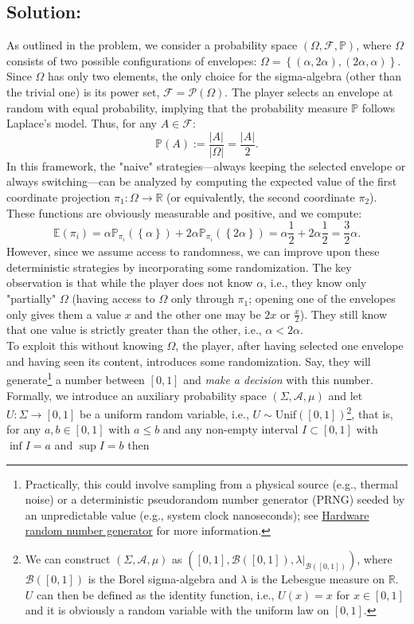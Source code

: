 \documentclass[11pt, a4paper, oneside]{article}
\newcommand{\solution}[1][]{\subsection*{#1}\hfill \par}
\theoremstyle{remark}
\theoremstyle{lemma}
\begin{document}
\solution[Solution:]
As outlined in the problem, we consider a probability space $\left(\Omega,\mathcal{F},\mathbb{P}\right)$, where $\Omega$ consists of two possible configurations of envelopes: $\Omega = \left\{\left(\alpha, 2\alpha\right), \left(2\alpha, \alpha\right)\right\}$. Since $\Omega$ has only two elements, the only choice for the sigma-algebra (other than the trivial one) is its power set, $\mathcal{F} = \mathscr{P}\left(\Omega\right)$. The player selects an envelope at random with equal probability, implying that the probability measure $\mathbb{P}$ follows Laplace's model. Thus, for any $A \in \mathcal{F}$:
    \[
    \mathbb{P}\left(A\right) := \frac{\left|A\right|}{\left|\Omega\right|} = \frac{\left|A\right|}{2}.
    \]
In this framework, the "naive" strategies—always keeping the selected envelope or always switching—can be analyzed by computing the expected value of the first coordinate projection $\pi_1:\Omega\rightarrow\mathbb{R}$ (or equivalently, the second coordinate $\pi_2$). These functions are obviously measurable and positive, and we compute:
$$\mathbb{E}\left(\pi_i\right)=\alpha\mathbb{P}_{\pi_i}\left(\left\{\alpha\right\}\right)+2\alpha\mathbb{P}_{\pi_i}\left(\left\{2\alpha\right\}\right)=\alpha\frac{1}{2}+2\alpha\frac{1}{2}=\frac{3}{2}\alpha.$$ 
However, since we assume access to randomness, we can improve upon these deterministic strategies by incorporating some randomization. The key observation is that while the player does not know $\alpha$, i.e., they know only "partially" $\Omega$ (having access to $\Omega$ only through $\pi_1$; opening one of the envelopes only gives them a value $x$ and the other one may be $2x$ or $\frac{x}{2}$). They still know that one value is strictly greater than the other, i.e., $\alpha < 2\alpha$. \\
To exploit this without knowing $\Omega$, the player, after having selected one envelope and having seen its content, introduces some randomization. Say, they will generate\footnote{Practically, this could involve sampling from a physical source (e.g., thermal noise) or a deterministic pseudorandom number generator (PRNG) seeded by an unpredictable value (e.g., system clock nanoseconds); see \href{https://en.wikipedia.org/wiki/Hardware_random_number_generator}{Hardware random number generator} for more information.} a number between $\left[0,1\right]$ and \textit{make a decision} with this number. Formally, we introduce an auxiliary probability space $\left(\Sigma,\mathcal{A},\mu\right)$ and let $U:\Sigma\rightarrow\left[0,1\right]$ be a uniform random variable, i.e., $U \sim \text{Unif}\left(\left[0,1\right]\right)$\footnote{We can construct $\left(\Sigma,\mathcal{A},\mu\right)$ as $\left(\left[0,1\right],\mathcal{B}\left(\left[0,1\right]\right),\lambda|_{\mathcal{B}\left(\left[0,1\right]\right)}\right)$, where $\mathcal{B}\left(\left[0,1\right]\right)$ is the Borel sigma-algebra and $\lambda$ is the Lebesgue measure on $\mathbb{R}$. $U$ can then be defined as the identity function, i.e., $U(x) = x$ for $x \in \left[0,1\right]$ and it is obviously a random variable with the uniform law on $[0,1]$.}, that is, for any $a,b \in\left[0,1\right]$ with $a\leq b$ and any non-empty interval $I\subset \left[0,1\right]$ with $\inf I=a$ and $\sup I=b$ then
\end{document}
